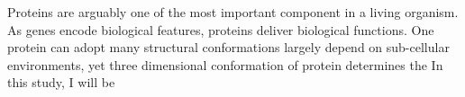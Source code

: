 Proteins are arguably one of the most important component in a living organism. As genes encode biological features, proteins deliver biological functions. One protein can adopt many structural conformations largely depend on sub-cellular environments, yet three dimensional conformation of protein determines the     In this study, I will be 